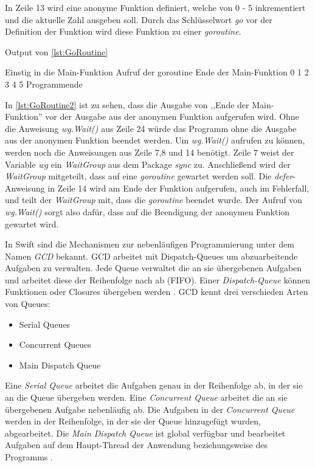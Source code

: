 In Zeile 13 wird eine anonyme Funktion definiert, welche von 0 - 5 inkrementiert und die aktuelle Zahl ausgeben soll.
Durch das Schlüsselwort \textit{go} vor der Definition der Funktion wird diese Funktion zu einer \textit{goroutine}. 

\begin{listing}[H]
\caption{Output von \autoref{lst:GoRoutine}}
\label{lst:GoRoutine2}
\begin{Commandline}
Einstig in die Main-Funktion
Aufruf der goroutine
Ende der Main-Funktion
0 1 2 3 4 5
Programmende
\end{Commandline}
\end{listing}

In \autoref{lst:GoRoutine2} ist zu sehen, dass die Ausgabe von ,,Ende der Main-Funktion'' vor der Ausgabe aus der anonymen Funktion aufgerufen wird.
Ohne die Anweisung \textit{wg.Wait()} aus Zeile 24 würde das Programm ohne die Ausgabe aus der anonymen Funktion beendet werden.
Um \textit{wg.Wait()} aufrufen zu können, werden noch die Anweisungen aus Zeile 7,8 und 14 benötigt.
Zeile 7 weist der Variable \textit{wg} ein \textit{WaitGroup} aus dem Package \textit{sync} zu.
Anschließend wird der \textit{WaitGroup} mitgeteilt, dass auf eine \textit{goroutine} gewartet werden soll. 
Die \textit{defer}-Anweisung in Zeile 14 wird am Ende der Funktion aufgerufen, auch im Fehlerfall, und teilt der \textit{WaitGroup} mit, dass die \textit{goroutine} beendet wurde.
Der Aufruf von \textit{wg.Wait()} sorgt also dafür, dass auf die Beendigung der anonymen Funktion gewartet wird.

In Swift sind die Mechanismen zur nebenläufigen Programmierung unter dem Namen \textit{\gls{GCD}} bekannt.
\gls{GCD} arbeitet mit Dispatch-Queues um abzuarbeitende Aufgaben zu verwalten.
Jede Queue verwaltet die an sie übergebenen Aufgaben und arbeitet diese der Reihenfolge nach ab (FIFO). 
Einer \textit{Dispatch-Queue} können Funktionen oder Closures übergeben werden \cite[S.254]{Hoffman.2017}.
\gls{GCD} kennt drei verschieden Arten von Queues:

\begin{itemize}
    \item Serial Queues
    \item Concurrent Queues
    \item Main Dispatch Queue
\end{itemize}

Eine \textit{Serial Queue} arbeitet die Aufgaben genau in der Reihenfolge ab, in der sie an die Queue übergeben werden.
Eine \textit{Concurrent Queue} arbeitet die an sie übergebenen Aufgabe nebenläufig ab. 
Die Aufgaben in der \textit{Concurrent Queue} werden in der Reihenfolge, in der sie der Queue hinzugefügt wurden, abgearbeitet.
Die \textit{Main Dispatch Queue} ist global verfügbar und bearbeitet Aufgaben auf dem Haupt-Thread der Anwendung beziehungsweise des Programms \cite[S.255]{Hoffman.2017}.

